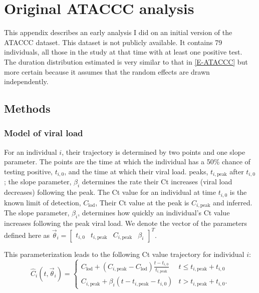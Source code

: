 \documentclass[thesis.tex]{subfiles}
\begin{document}
\chapter{Original ATACCC analysis} \label{ATACCC:sec:original-analysis}

This appendix describes an early analysis I did on an initial version of the ATACCC dataset.
This dataset is not publicly available.
It contains 79 individuals, all those in the study at that time with at least one positive test.
The duration distribution estimated is very similar to that in \cref{E-ATACCC} but more certain because it assumes that the random effects are drawn independently.

\section{Methods}

\subsection{Model of viral load}

For an individual $i$, their trajectory is determined by two points and one slope parameter.
The points are the time at which the individual has a 50\% chance of testing positive, $t_{i,0}$, and the time at which their viral load.
peaks, $t_{i,\text{peak}}$ after $t_{i,0}$; the slope parameter, $\beta_i$ determines the rate their Ct increases (viral load decreases) following the peak.
The Ct value for an individual at time $t_{i,0}$ is the known limit of detection, $C_\text{lod}$,
Their Ct value at the peak is $C_{i,\text{peak}}$ and inferred.
The slope parameter, $\beta_i$, determines how quickly an individual's Ct value increases following the peak viral load.
We denote the vector of the parameters defined here as $\vec\theta_i = \begin{bmatrix} t_{i,0} & t_{i,\text{peak}} & C_{i,\text{peak}} &  \beta_i \end{bmatrix}^T$.

This parameterization leads to the following Ct value trajectory for individual $i$:
$$
\hat{C}_i(t, \vec\theta_i) = \begin{cases}
  C_{\text{lod}} + (C_{i,\text{peak}} - C_{\text{lod}}) \frac{t - t_{i,0}}{t_{i,\text{peak}}}
    &t \leq t_{i,\text{peak}} + t_{i,0} \\
  C_{i,\text{peak}} + \beta_i (t - t_{i,\text{peak}} - t_{i,0})
    &t > t_{i,\text{peak}} + t_{i,0}.
\end{cases}
$$
\end{document}
